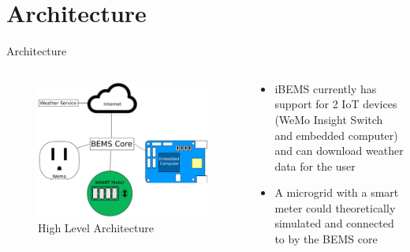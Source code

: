 \documentclass{beamer}
\begin{document}
\section{Architecture}
\begin{frame}{Architecture}{} %
    \begin{columns}
        {\small
        \begin{figure}
            \centering
            \includegraphics[scale=0.3]{figs/highLevelArchitecture.pdf}
            \caption{High Level Architecture}
            \label{fig:high_level_arch}
        \end{figure}
        }
        {\small
            \begin{block}{}
                \begin{itemize}
                    \item iBEMS currently has support for 2 IoT devices (WeMo Insight Switch and embedded computer) and can download weather data for the user
                    \item A microgrid with a smart meter could theoretically simulated and connected to by the BEMS core
                \end{itemize}
            \end{block}
        }
    \end{columns}
\end{frame}
\end{document}
